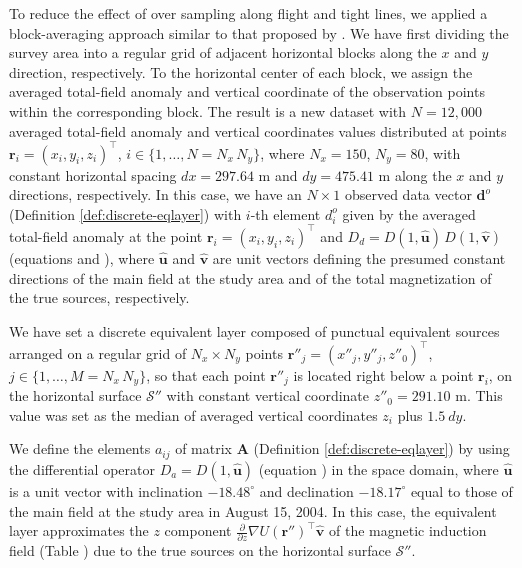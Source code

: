 To reduce the effect of over sampling along flight and tight lines, we applied a 
block-averaging approach similar to that proposed by \citet{soler_uieda2021}. 
We have first dividing the survey area into a regular grid of adjacent 
horizontal blocks along the $x$ and $y$ direction, respectively. 
To the horizontal center of each block, we assign the averaged total-field anomaly and
vertical coordinate of the observation points within the corresponding block.
The result is a new dataset with $N = 12,000$ averaged total-field anomaly and vertical 
coordinates values distributed at points $\mathbf{r}_{i} = (x_{i}, y_{i}, z_{i})^{\top}$, 
$i \in \{1, \dots, N = N_{x} \, N_{y}\}$, where $N_{x} = 150$, $N_{y} = 80$, with constant  
horizontal spacing $dx = 297.64$ m and $dy = 475.41$ m along the $x$ and $y$ directions, 
respectively. 
In this case, we have an $N \times 1$ observed data vector $\mathbf{d}^{o}$ 
(Definition \ref{def:discrete-eqlayer}) with $i$-th element $d^{o}_{i}$ given by the 
averaged total-field anomaly at the point $\mathbf{r}_{i} = (x_{i}, y_{i}, z_{i})^{\top}$ 
and $D_{d} = D(1, \hat{\mathbf{u}})\, D(1, \hat{\mathbf{v}})$ 
(equations  and ), where 
$\hat{\mathbf{u}}$ and $\hat{\mathbf{v}}$ are unit vectors defining the presumed constant 
directions of the main field at the study area and of the total magnetization of the true 
sources, respectively.

We have set a discrete equivalent layer composed of punctual equivalent sources arranged on 
a regular grid of $N_{x} \times N_{y}$ points 
$\mathbf{r}''_{j} = (x''_{j}, y''_{j}, z''_{0})^{\top}$, $j \in \{1, \dots, M = N_{x} \, N_{y}\}$, 
so that each point $\mathbf{r}''_{j}$ is located right below a point  
$\mathbf{r}_{i}$, on the horizontal surface $\mathcal{S}''$ with constant vertical coordinate 
$z''_{0} = 291.10$ m. This value was set as the median of averaged vertical coordinates $z_{i}$
plus $1.5 \: dy$. 

We define the elements $a_{ij}$ of matrix $\mathbf{A}$ (Definition \ref{def:discrete-eqlayer}) 
by using the differential operator $D_{a} = D(1, \hat{\mathbf{u}})$ 
(equation ) in the space domain, where $\hat{\mathbf{u}}$ is 
a unit vector with inclination $-18.48^{\circ}$ and declination $-18.17^{\circ}$ equal to 
those of the main field at the study area in August 15, 2004. 
In this case, the equivalent layer approximates the 
$z$ component  $\frac{\partial}{\partial z}\nabla U(\mathbf{r}'')^{\top} \hat{\mathbf{v}}$
of the magnetic induction field (Table ) due to the true sources on the 
horizontal surface $\mathcal{S}''$.


